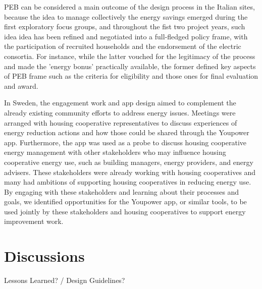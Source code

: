 PEB can be considered a main outcome of the design process in the Italian sites, because 
the idea to manage collectively the energy savings emerged during the first exploratory focus groups,
and throughout the fist two project years, such idea idea has been refined and negotiated into
a full-fledged policy frame, with the participation of recruited households and the endorsement
of the electric consortia. For instance, while the latter vouched for the legitimacy of the process
and made the 'energy bonus' practically available, the former defined key aspects of PEB frame such as the criteria for eligibility and those ones for final evaluation and award.  


In Sweden, the engagement work and app design aimed to complement the already existing community efforts to address energy issues. Meetings were arranged with housing cooperative representatives to discuss experiences of energy reduction actions and how those could be shared through the Youpower app. Furthermore, the app was used as a probe to discuss housing cooperative energy management with other stakeholders who may influence housing cooperative energy use, such as building managers, energy providers, and energy advisers. These stakeholders were already working with housing cooperatives and many had ambitions of supporting housing cooperatives in reducing energy use. By engaging with these stakeholders and learning about their processes and goals, we identified opportunities for the Youpower app, or similar tools, to be used jointly by these stakeholders and housing cooperatives to support energy improvement work.

\section{Discussions} %
\label{sec:disc}

\begin{svgraybox}
Lessons Learned?  / Design Guidelines? 
\end{svgraybox}